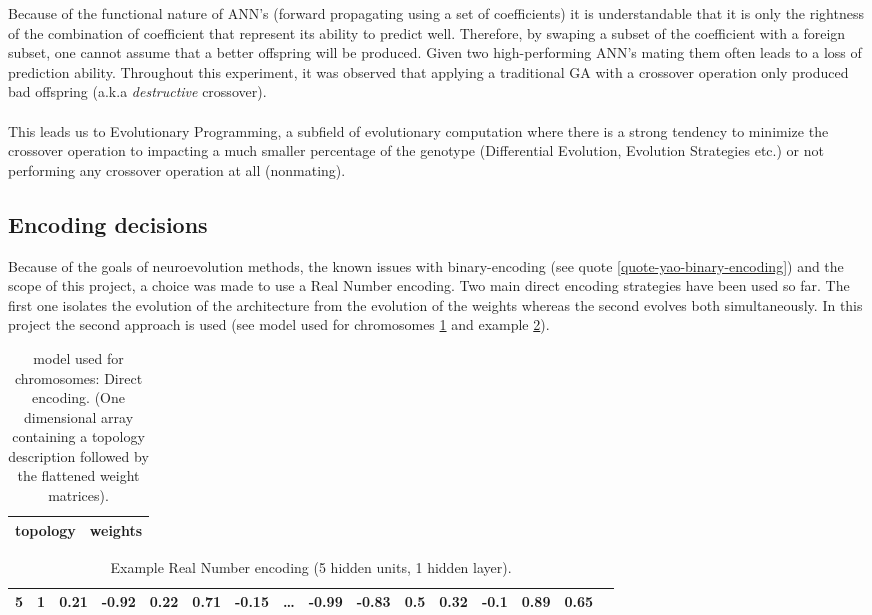 \documentclass[a4paper,12pt, oneside]{memoir}
\begin{document}
Because of the functional nature of ANN's (forward propagating using a set of coefficients) it is understandable that it is only the rightness of the combination of coefficient that represent its ability to predict well. Therefore, by swaping a subset of the coefficient with a foreign subset, one cannot assume that a better offspring will be produced. Given two high-performing ANN's mating them often leads to a loss of prediction ability. Throughout this experiment, it was observed that applying a traditional GA with a crossover operation only produced bad offspring (a.k.a \textit{destructive} crossover).
\\
\\
This leads us to Evolutionary Programming, a subfield of evolutionary computation where there is a strong tendency to minimize the crossover operation to impacting a much smaller percentage of the genotype (Differential Evolution, Evolution Strategies etc.) or not performing any crossover operation at all (nonmating).

\subsection{Encoding decisions}
Because of the goals of neuroevolution methods, the known issues with binary-encoding (see quote \ref{quote-yao-binary-encoding}) and the scope of this project, a choice was made to use a Real Number encoding. Two main direct encoding strategies have been used so far. The first one isolates the evolution of the architecture from the evolution of the weights whereas the second evolves both simultaneously. In this project the second approach is used (see model used for chromosomes \ref{table:genome-encoding} and example \ref{table:genome-encoding-example}).

\begin{table}[h]
\centering
\begin{tabular}{| l | p{5cm} |}
  \hline
    topology    &  weights  \\
  \hline
  \end{tabular}
  \caption{model used for chromosomes: Direct encoding. (One dimensional array containing a topology description followed by the flattened weight matrices).}
  \label{table:genome-encoding}
\end{table}

\begin{table}[h]
\centering
\begin{tabular}{|l|l|l|l|l|l|l|l|l|l|l|l|l|l|l|l|}
  \hline
   5 & 1 & 0.21 & -0.92 & 0.22 & 0.71 & -0.15 & \dots & -0.99 & -0.83 & 0.5 & 0.32 & -0.1 & 0.89 & 0.65 \\
  \hline
  \end{tabular}
  \caption{Example Real Number encoding (5 hidden units, 1 hidden layer).}
  \label{table:genome-encoding-example}
\end{table}
\end{document}
